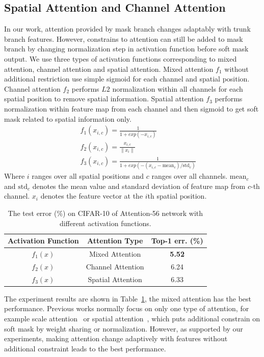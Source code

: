 \documentclass[10pt,twocolumn,letterpaper]{article}
\begin{document}
\subsection{Spatial Attention and Channel Attention}
In our work, attention provided by mask branch changes adaptably with trunk branch features. However, constrains to attention can still be added to mask branch by changing normalization step in activation function before soft mask output. We use three types of activation functions corresponding to mixed attention, channel attention and spatial attention. Mixed attention $f_{1}$ without additional restriction use simple sigmoid for each channel and spatial position. Channel attention $f_{2}$ performs $L2$ normalization within all channels for each spatial position to remove spatial information. Spatial attention $f_{3}$ performs normalization within feature map from each channel and then sigmoid to get soft mask related to spatial information only.
\begin{eqnarray}
&&f_{1}(x_{i,c}) = \frac{1}{1+ exp(-x_{i,c})}\\
&&f_{2}(x_{i,c}) = \frac{x_{i,c}}{\|x_{i}\|}\\
&&f_{3}(x_{i,c}) = \frac{1}{1+ exp(-(x_{i,c} - \text{mean}_c) / \text{std}_c)}
\end{eqnarray}
Where $i$ ranges over all spatial positions and $c$ ranges over all channels. $\text{mean}_c$ and $\text{std}_c$ denotes the mean value and standard deviation of feature map from $c$-th channel. $x_{i}$ denotes the feature vector at the $i$th spatial position.

\begin{table}\small
\setlength{\abovecaptionskip}{0pt}
\setlength{\belowcaptionskip}{-5pt}
\begin{center}
\begin{tabular}{c|c|c} \hline
Activation Function & Attention Type & Top-1 err. (\%) \\
\hline
$f_{1}(x)$ & Mixed Attention &\textbf{5.52}\\
\hline
$f_{2}(x)$  & Channel Attention &6.24\\
\hline
$f_{3}(x)$ & Spatial Attention &6.33\\
\hline
\end{tabular}
\end{center}
\caption{The test error (\%) on CIFAR-10 of Attention-56 network with different activation functions.}
\label{tab:activation_exp}
\end{table}

The experiment results are shown in Table~\ref{tab:activation_exp}, the mixed attention has the best performance. Previous works normally focus on only one type of attention, for example scale attention~\cite{chen2015attention} or spatial attention~\cite{jaderberg2015spatial}, which puts additional constrain on soft mask by weight sharing or normalization. However, as supported by our experiments, making attention change adaptively with features without additional constraint leads to the best performance.
\end{document}
